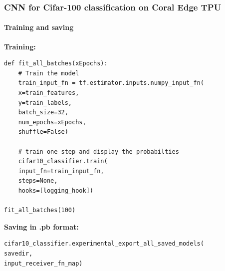 \documentclass{beamer}
\begin{document}
\begin{frame}[fragile]
\frametitle{CNN for Cifar-100 classification on Coral Edge TPU}
\framesubtitle{Training and saving}
\textbf{Training:}
\begin{lstlisting}
def fit_all_batches(xEpochs):
    # Train the model
    train_input_fn = tf.estimator.inputs.numpy_input_fn(
    x=train_features,
    y=train_labels,
    batch_size=32,
    num_epochs=xEpochs,
    shuffle=False)
    
    # train one step and display the probabilties
    cifar10_classifier.train(
    input_fn=train_input_fn,
    steps=None,
    hooks=[logging_hook])
	
fit_all_batches(100)
\end{lstlisting}
\textbf{Saving in .pb format:}
\begin{lstlisting}
cifar10_classifier.experimental_export_all_saved_models(
savedir,
input_receiver_fn_map)
\end{lstlisting}
\end{frame}
\end{document}
